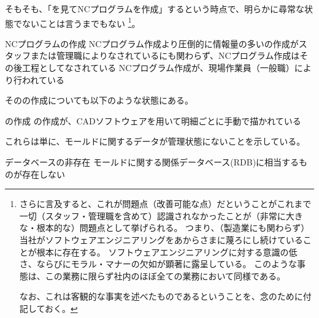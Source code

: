\clearpage
そもそも、「\nameDrawing を見てNCプログラムを作成」するという時点で、明らかに尋常な状態でないことは言うまでもない
\footnote{さらに言及すると、これが問題点（改善可能な点）だということがこれまで一切（スタッフ・管理職を含めて）認識されなかったことが（非常に大きな・根本的な）問題点として挙げられる。
つまり、（製造業にも関わらず）当社がソフトウェアエンジニアリングをあからさまに蔑ろにし続けていることが根本に存在する。
ソフトウェアエンジニアリングに対する意識の低さ、ならびにモラル・マナーの欠如が顕著に露呈している。
このような事態は、この業務に限らず社内のほぼ全ての業務において同様である。

なお、これは客観的な事実を述べたものであるということを、念のために付記しておく。}。
\begin{Issues}{NCプログラムの作成}
NCプログラム作成より圧倒的に情報量の多い\nameDrawing の作成がスタッフまたは管理職によりなされているにも関わらず、NCプログラム作成はその後工程としてなされている
\tcbline*
NCプログラム作成が、現場作業員（一般職）により行われている
\end{Issues}
その\nameDrawing の作成についても以下のような状態にある。
\begin{Issues}{\nameDrawing の作成}
\nameDrawing の作成が、CADソフトウェアを用いて明細ごとに手動で描かれている
\end{Issues}
これらは単に、モールドに関するデータが管理状態にないことを示している。
\begin{Issues}{データベースの非存在}
モールドに関する関係データベース(RDB)に相当するものが存在しない
\end{Issues}
